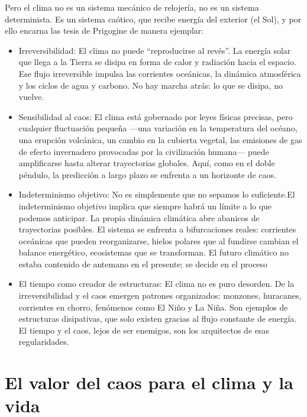 \documentclass[
  10pt,
  a4paper,
  DIV=11,
  numbers=noendperiod,
  open=any]{scrreprt}
\numberwithin{equation}{chapter}
\numberwithin{equation}{section}
\renewcommand{\[}{\begin{equation}}
\renewcommand{\]}{\end{equation}}
\begin{document}
Pero el clima no es un sistema mecánico de relojería, no es un sistema
determinista. Es un sistema caótico, que recibe energía del exterior (el
Sol), y por ello encarna las tesis de Prigogine de manera ejemplar:

\begin{itemize}
\item
  Irreversibilidad: El clima no puede ``reproducirse al revés''. La
  energía solar que llega a la Tierra se disipa en forma de calor y
  radiación hacia el espacio. Ese flujo irreversible impulsa las
  corrientes oceánicas, la dinámica atmosférica y los ciclos de agua y
  carbono. No hay marcha atrás: lo que se disipa, no vuelve.
\item
  Sensibilidad al caos: El clima está gobernado por leyes físicas
  precisas, pero cualquier fluctuación pequeña ---una variación en la
  temperatura del océano, una erupción volcánica, un cambio en la
  cubierta vegetal, las emisiones de gas de efecto invernadero
  provocadas por la civilización humana--- puede amplificarse hasta
  alterar trayectorias globales. Aquí, como en el doble péndulo, la
  predicción a largo plazo se enfrenta a un horizonte de caos.
\item
  Indeterminismo objetivo: No es simplemente que no sepamos lo
  suficiente.El indeterminismo objetivo implica que siempre habrá un
  límite a lo que podemos anticipar. La propia dinámica climática abre
  abanicos de trayectorias posibles. El sistema se enfrenta a
  bifurcaciones reales: corrientes oceánicas que pueden reorganizarse,
  hielos polares que al fundirse cambian el balance energético,
  ecosistemas que se transforman. El futuro climático no estaba
  contenido de antemano en el presente; se decide en el proceso
\item
  El tiempo como creador de estructuras: El clima no es puro desorden.
  De la irreversibilidad y el caos emergen patrones organizados:
  monzones, huracanes, corrientes en chorro, fenómenos como El Niño y La
  Niña. Son ejemplos de estructuras disipativas, que solo existen
  gracias al flujo constante de energía. El tiempo y el caos, lejos de
  ser enemigos, son los arquitectos de esas regularidades.
\end{itemize}

\section{El valor del caos para el clima y la
vida}\label{el-valor-del-caos-para-el-clima-y-la-vida}
\end{document}
